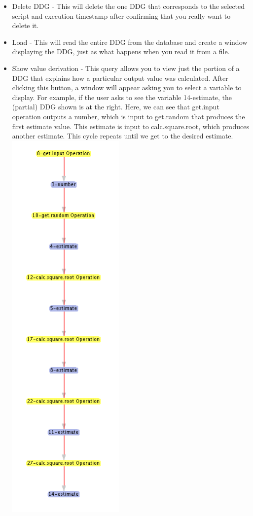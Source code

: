 \documentclass[12pt]{article}
\newcommand\liststyleWWviiiNumii{%
\renewcommand\labelitemi{•}
\renewcommand\labelitemii{•}
\renewcommand\labelitemiii{•}
\renewcommand\labelitemiv{•}
}
\begin{document}
{\liststyleWWviiiNumii
\begin{itemize}
\item {\color{black}
Delete DDG - This will delete the one DDG that corresponds to the selected script and execution timestamp after confirming that you really want to delete it.}
\item {\color{black}
Load - This will read the entire DDG from the database and create a window displaying the DDG, just as what happens when you read it from a file.}
\item {\color{black}
Show value derivation - This query allows you to view just the portion of a DDG that explains how a particular output value was calculated. After clicking this button, a window will appear asking you to select a variable to display. For example, if the user asks to see the variable 14-estimate, the (partial) DDG shown is at the right. Here, we can see that get.input operation outputs a number, which is input to get.random that produces the first estimate value. This estimate is input to calc.square.root, which produces another estimate. This cycle repeats until we get to the desired estimate. \newline \newline
  \includegraphics[width=2.2654in,height=7.8472in]{UsingDDGExplorer-img/UsingDDGExplorer-img008.png}
}
\end{itemize}}
\end{document}
